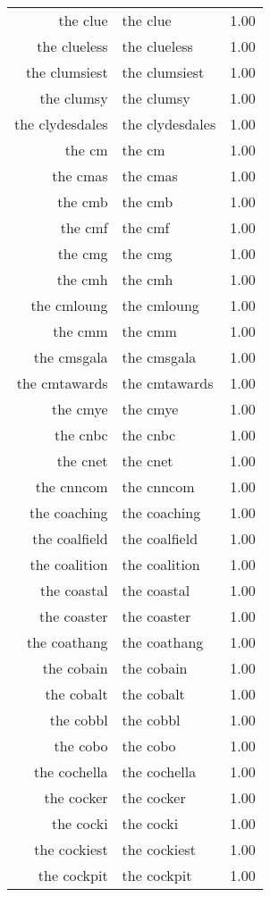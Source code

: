 \begin{table}[ht]
\begin{tabular}{rlr}
  the clue & the clue & 1.00 \\ 
  the clueless & the clueless & 1.00 \\ 
  the clumsiest & the clumsiest & 1.00 \\ 
  the clumsy & the clumsy & 1.00 \\ 
  the clydesdales & the clydesdales & 1.00 \\ 
  the cm & the cm & 1.00 \\ 
  the cmas & the cmas & 1.00 \\ 
  the cmb & the cmb & 1.00 \\ 
  the cmf & the cmf & 1.00 \\ 
  the cmg & the cmg & 1.00 \\ 
  the cmh & the cmh & 1.00 \\ 
  the cmloung & the cmloung & 1.00 \\ 
  the cmm & the cmm & 1.00 \\ 
  the cmsgala & the cmsgala & 1.00 \\ 
  the cmtawards & the cmtawards & 1.00 \\ 
  the cmye & the cmye & 1.00 \\ 
  the cnbc & the cnbc & 1.00 \\ 
  the cnet & the cnet & 1.00 \\ 
  the cnncom & the cnncom & 1.00 \\ 
  the coaching & the coaching & 1.00 \\ 
  the coalfield & the coalfield & 1.00 \\ 
  the coalition & the coalition & 1.00 \\ 
  the coastal & the coastal & 1.00 \\ 
  the coaster & the coaster & 1.00 \\ 
  the coathang & the coathang & 1.00 \\ 
  the cobain & the cobain & 1.00 \\ 
  the cobalt & the cobalt & 1.00 \\ 
  the cobbl & the cobbl & 1.00 \\ 
  the cobo & the cobo & 1.00 \\ 
  the cochella & the cochella & 1.00 \\ 
  the cocker & the cocker & 1.00 \\ 
  the cocki & the cocki & 1.00 \\ 
  the cockiest & the cockiest & 1.00 \\ 
  the cockpit & the cockpit & 1.00 \\ 

\end{tabular}
\end{table}
